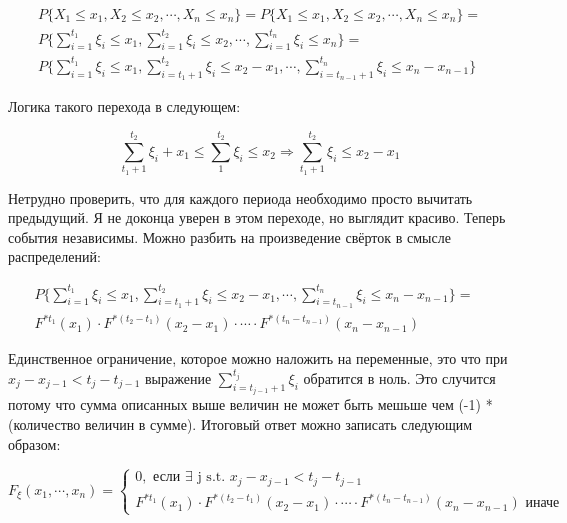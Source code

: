 \documentclass[a4paper,12pt]{article}
\begin{document}
\begin{equation*}
\begin{aligned}
P\{  X_1 \le x_1, X_2 \le x_2, \cdots, X_n \le x_n \}  = P\{  X_1 \le x_1, X_2 \le x_2, \cdots, X_n \le x_n \} =\\
P\{  \sum_{i = 1}^{t_1}\xi_i \le x_1, \sum_{i = 1}^{t_2}\xi_i \le x_2, \cdots, \sum_{i = 1}^{t_n}\xi_i \le x_n \} = \\ P\{  \sum_{i = 1}^{t_1}\xi_i \le x_1, \sum_{i = t_1 + 1}^{t_2}\xi_i \le x_2 - x_1, \cdots, \sum_{i = t_{n-1}+1}^{t_n}\xi_i \le x_n - x_{n-1} \}
\end{aligned}
\end{equation*}




Логика такого перехода в следующем:

\[ \sum_{t_1 + 1}^{t_2}\xi_i + x_1 \le \sum_{1}^{t_2} \xi_i \le x_2 \Rightarrow \sum_{t_1 + 1}^{t_2} \xi_i \le x_2 - x_1\]

Нетрудно проверить, что для каждого периода необходимо просто вычитать предыдущий. Я не доконца уверен в этом переходе, но выглядит красиво. Теперь события независимы. Можно разбить на произведение свёрток в смысле распределений:


\begin{equation*}
\begin{aligned}
 P\{  \sum_{i = 1}^{t_1}\xi_i \le x_1, \sum_{i = t_1 + 1}^{t_2}\xi_i \le x_2 - x_1, \cdots, \sum_{i = t_{n-1}}^{t_n}\xi_i \le x_n - x_{n-1}\} =&\\ F^{*t_1}(x_1) \cdot F^{*(t_2 - t_1)}(x_2 - x_1) \cdot \cdots \cdot F^{*(t_n - t_{n-1})}(x_n - x_{n-1})
\end{aligned}
\end{equation*}

Единственное ограничение, которое можно наложить на переменные, это что при  $ x_j - x_{j-1}  < t_j - t_{j-1}$ выражение $ \sum_{i = t_{j-1} + 1}^{t_j}\xi_i $ обратится в ноль. Это случится потому что сумма описанных выше величин не может быть мешьше чем (-1) * (количество величин в сумме). Итоговый ответ можно записать следующим образом:

$ F_\xi(x_1, \cdots, x_n) =
\begin{cases}
	0, \text{ если } \exists \text{ j s.t. } x_j - x_{j-1}  < t_j - t_{j-1} \\
 F^{*t_1}(x_1) \cdot F^{*(t_2 - t_1)}(x_2 - x_1) \cdot \cdots \cdot F^{*(t_n - t_{n-1})}(x_n - x_{n-1}) \text{ иначе }
\end{cases}
$
\end{document}
